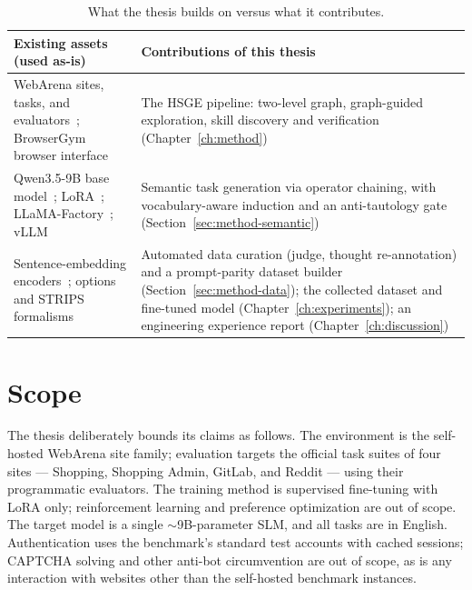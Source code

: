 \begin{table}[H]
\centering
\caption[Existing assets versus contributions of this thesis]{What the
thesis builds on versus what it contributes.}
\label{tab:contrib}
\small
\begin{tabular}{L{6.4cm} L{6.8cm}}
\toprule
\textbf{Existing assets (used as-is)} & \textbf{Contributions of this thesis} \\
\midrule
WebArena sites, tasks, and evaluators~\cite{zhou2024webarena};
BrowserGym browser interface~\cite{dechezelles2025browsergym} &
The HSGE pipeline: two-level graph, graph-guided exploration, skill
discovery and verification (Chapter~\ref{ch:method}) \\
\addlinespace
Qwen3.5-9B base model~\cite{yang2025qwen3}; LoRA~\cite{hu2022lora};
LLaMA-Factory~\cite{zheng2024llamafactory}; vLLM~\cite{kwon2023vllm} &
Semantic task generation via operator chaining, with vocabulary-aware
induction and an anti-tautology gate (Section~\ref{sec:method-semantic}) \\
\addlinespace
Sentence-embedding encoders~\cite{reimers2019sbert};
options and STRIPS formalisms~\cite{sutton1999options, fikes1971strips} &
Automated data curation (judge, thought re-annotation) and a prompt-parity
dataset builder (Section~\ref{sec:method-data}); the collected dataset and
fine-tuned model (Chapter~\ref{ch:experiments}); an engineering experience
report (Chapter~\ref{ch:discussion}) \\
\bottomrule
\end{tabular}
\end{table}

\section{Scope}
\label{sec:intro-scope}

The thesis deliberately bounds its claims as follows. The environment is the
self-hosted WebArena site family; evaluation targets the official task
suites of four sites --- Shopping, Shopping Admin, GitLab, and Reddit ---
using their programmatic evaluators. The training method is supervised
fine-tuning with LoRA only; reinforcement learning and preference
optimization are out of scope. The target model is a single
$\sim$9B-parameter SLM, and all tasks are in English. Authentication uses
the benchmark's standard test accounts with cached sessions; CAPTCHA solving
and other anti-bot circumvention are out of scope, as is any interaction
with websites other than the self-hosted benchmark instances.

